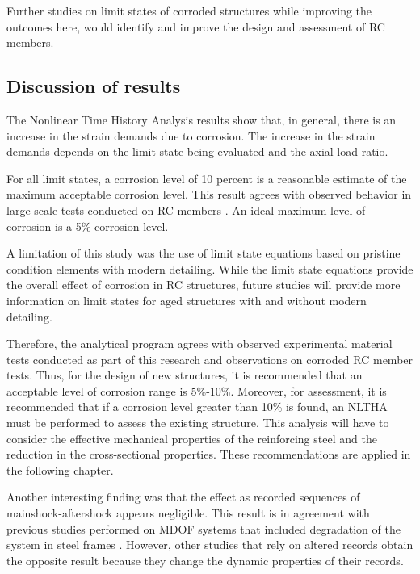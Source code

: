 Further studies on limit states of corroded structures while improving the outcomes here,  would identify and improve the design and assessment of RC members.

\subsection{Discussion of results}

The Nonlinear Time History Analysis results show that, in general, there is an increase in the strain demands due to corrosion. The increase in the strain demands depends on the limit state being evaluated and the axial load ratio. 

For all limit states, a corrosion level of 10 percent is a reasonable estimate of the maximum acceptable corrosion level. This result agrees with observed behavior in large-scale tests conducted on RC members \cite{Ma2012}\cite{Ma2018}. An ideal maximum level of corrosion is a 5\% corrosion level.

A limitation of this study was the use of limit state equations based on pristine condition elements with modern detailing. While the limit state equations provide the overall effect of corrosion in RC structures, future studies will provide more information on limit states for aged structures with and without modern detailing.

Therefore, the analytical program agrees with observed experimental material tests conducted as part of this research and observations on corroded RC member tests. Thus, for the design of new structures, it is recommended that an acceptable level of corrosion range is 5\%-10\%. Moreover, for assessment, it is recommended that if a corrosion level greater than 10\% is found, an NLTHA must be performed to assess the existing structure. This analysis will have to consider the effective mechanical properties of the reinforcing steel and the reduction in the cross-sectional properties. These recommendations are applied in the following chapter. 

Another interesting finding was that the effect as recorded sequences of mainshock-aftershock appears negligible. This result is in agreement with previous studies performed on MDOF systems that included degradation of the system in steel frames \cite{Ruiz-Garcia2011}. However, other studies that rely on altered records obtain the opposite result because they change the dynamic properties of their records.